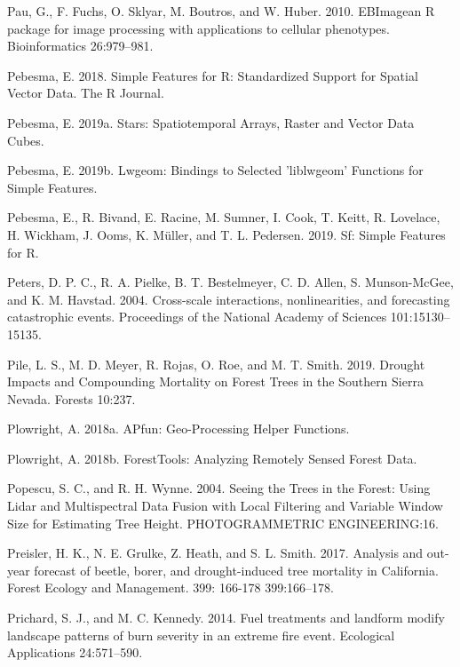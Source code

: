 \documentclass[twoside,12pt,final]{ucthesis-CA2012}
\begin{document}
\begin{ucmainmatter}
\hypertarget{ref-pau2010}{}
Pau, G., F. Fuchs, O. Sklyar, M. Boutros, and W. Huber. 2010. EBImagean
R package for image processing with applications to cellular phenotypes.
Bioinformatics 26:979--981.

\hypertarget{ref-pebesma2018}{}
Pebesma, E. 2018. Simple Features for R: Standardized Support for
Spatial Vector Data. The R Journal.

\hypertarget{ref-pebesma2019b}{}
Pebesma, E. 2019a. Stars: Spatiotemporal Arrays, Raster and Vector Data
Cubes.

\hypertarget{ref-pebesma2019a}{}
Pebesma, E. 2019b. Lwgeom: Bindings to Selected 'liblwgeom' Functions
for Simple Features.

\hypertarget{ref-pebesma2019}{}
Pebesma, E., R. Bivand, E. Racine, M. Sumner, I. Cook, T. Keitt, R.
Lovelace, H. Wickham, J. Ooms, K. Müller, and T. L. Pedersen. 2019. Sf:
Simple Features for R.

\hypertarget{ref-peters2004}{}
Peters, D. P. C., R. A. Pielke, B. T. Bestelmeyer, C. D. Allen, S.
Munson-McGee, and K. M. Havstad. 2004. Cross-scale interactions,
nonlinearities, and forecasting catastrophic events. Proceedings of the
National Academy of Sciences 101:15130--15135.

\hypertarget{ref-pile2019}{}
Pile, L. S., M. D. Meyer, R. Rojas, O. Roe, and M. T. Smith. 2019.
Drought Impacts and Compounding Mortality on Forest Trees in the
Southern Sierra Nevada. Forests 10:237.

\hypertarget{ref-plowright2018a}{}
Plowright, A. 2018a. APfun: Geo-Processing Helper Functions.

\hypertarget{ref-plowright2018}{}
Plowright, A. 2018b. ForestTools: Analyzing Remotely Sensed Forest Data.

\hypertarget{ref-popescu2004}{}
Popescu, S. C., and R. H. Wynne. 2004. Seeing the Trees in the Forest:
Using Lidar and Multispectral Data Fusion with Local Filtering and
Variable Window Size for Estimating Tree Height. PHOTOGRAMMETRIC
ENGINEERING:16.

\hypertarget{ref-preisler2017}{}
Preisler, H. K., N. E. Grulke, Z. Heath, and S. L. Smith. 2017. Analysis
and out-year forecast of beetle, borer, and drought-induced tree
mortality in California. Forest Ecology and Management. 399: 166-178
399:166--178.

\hypertarget{ref-prichard2014}{}
Prichard, S. J., and M. C. Kennedy. 2014. Fuel treatments and landform
modify landscape patterns of burn severity in an extreme fire event.
Ecological Applications 24:571--590.


\end{ucmainmatter}
\end{document}
